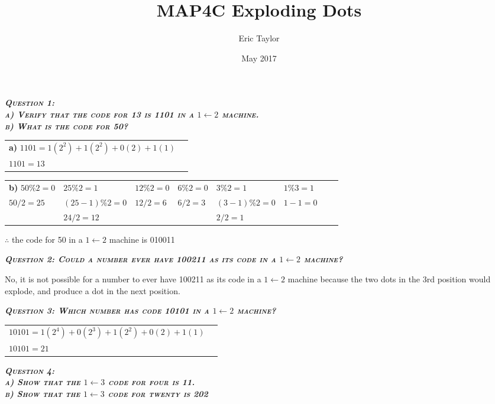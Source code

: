 \documentclass{article}
\title{MAP4C Exploding Dots}
\author{Eric Taylor}
\date{May 2017}
\begin{document}
\topmargin=0pt %
\headheight=0pt %
\headsep=0pt %
\footskip=0pt %
\textheight=700pt %

\setlength{\parindent}{0pt} %

\maketitle \thispagestyle{empty}

\textbf{\emph{\textsc{Question 1: \\
a) Verify that the code for 13 is 1101 in a $1 \leftarrow 2$ machine. \\
b) What is the code for 50?}}}

\begin{tabular}{l l}
    \textbf{a)} $1101 = 1(2^2)+1(2^2)+0(2)+1(1)$ 
    & \\
    $1101 = 13$
\end{tabular}

\begin{tabular}{l l l l l l l l}
    \textbf{b)} $50\%2=0$ & $25\%2=1$ & $12\%2=0$ & $6\%2=0$ & $3\%2=1$ & $1\%3=1$ &
    & \\
    $50/2=25$ & $(25-1)\%2=0$ & $12/2=6$ & $6/2=3$ & $(3-1)\%2=0$ & $1-1=0$
    & \\
    & $24/2=12$ & & & $2/2=1$ &
\end{tabular}
$\therefore$ the code for 50  in a $1 \leftarrow 2$ machine is 010011

\textbf{\emph{\textsc{Question 2: Could a number ever have 100211 as its code in a $1 \leftarrow 2$ machine?}}}

No, it is not possible for a number to ever have 100211 as its code in a $1 \leftarrow 2$ machine because the two dots in the 3rd position would explode, and produce a dot in the next position.

\textbf{\emph{\textsc{Question 3: Which number has code 10101 in a $1 \leftarrow 2$ machine?}}}

\begin{tabular}{l l}
    $10101 = 1(2^4)+0(2^3)+1(2^2)+0(2)+1(1)$ 
    & \\
    $10101 = 21$
\end{tabular}

\textbf{\emph{\textsc{Question 4: \\
a) Show that the $1 \leftarrow 3$ code for four is 11. \\
b) Show that the $1 \leftarrow 3$ code for twenty is 202}}}
\end{document}
